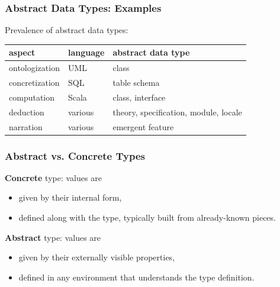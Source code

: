 \documentclass{beamer}
\begin{document}
\begin{frame}\frametitle{Abstract Data Types: Examples}
Prevalence of abstract data types:

\begin{center}
\begin{tabular}{l|ll}
aspect & language & abstract data type \\
\hline
ontologization & UML & class \\
concretization & SQL & table schema \\
computation & Scala & class, interface \\
deduction & various & theory, specification, module, locale \\
narration & various & emergent feature
\end{tabular}
\end{center}

\end{frame}

\begin{frame}\frametitle{Abstract vs. Concrete Types}
\textbf{Concrete} type: values are
\begin{itemize}
\item given by their internal form,
\item defined along with the type, typically built from already-known pieces.
\end{itemize}

\textbf{Abstract} type: values are
\begin{itemize}
\item given by their externally visible properties,
\item defined in any environment that understands the type definition.
\end{itemize}
\end{frame}
\end{document}
